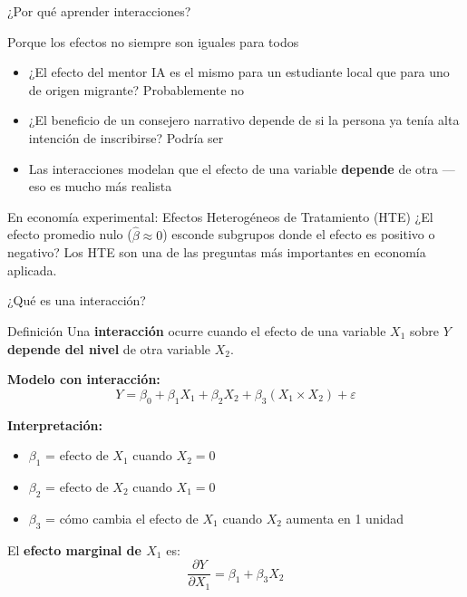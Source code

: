 \documentclass[aspectratio=169, 11pt]{beamer}
\begin{document}
\begin{frame}{¿Por qué aprender interacciones?}
\begin{exampleblock}{Porque los efectos no siempre son iguales para todos}
\small
\begin{itemize}\setlength{\itemsep}{2pt}
  \item ¿El efecto del mentor IA es el mismo para un estudiante local que para uno de origen migrante? Probablemente no
  \item ¿El beneficio de un consejero narrativo depende de si la persona ya tenía alta intención de inscribirse? Podría ser
  \item Las interacciones modelan que el efecto de una variable \textbf{depende} de otra --- eso es mucho más realista
\end{itemize}
\end{exampleblock}

\vspace{0.2cm}
\begin{block}{En economía experimental: Efectos Heterogéneos de Tratamiento (HTE)}
\small
¿El efecto promedio nulo ($\hat{\beta} \approx 0$) esconde subgrupos donde el efecto es positivo o negativo? Los HTE son una de las preguntas más importantes en economía aplicada.
\end{block}
\end{frame}

\begin{frame}{¿Qué es una interacción?}
\begin{block}{Definición}
Una \textbf{interacción} ocurre cuando el efecto de una variable $X_1$ sobre $Y$ \textbf{depende del nivel} de otra variable $X_2$.
\end{block}

\vspace{0.2cm}
\textbf{Modelo con interacción:}
\[
Y = \beta_0 + \beta_1 X_1 + \beta_2 X_2 + \beta_3 (X_1 \times X_2) + \varepsilon
\]

\vspace{0.1cm}
\textbf{Interpretación:}
\begin{itemize}
  \item $\beta_1$ = efecto de $X_1$ cuando $X_2 = 0$
  \item $\beta_2$ = efecto de $X_2$ cuando $X_1 = 0$
  \item $\beta_3$ = cómo cambia el efecto de $X_1$ cuando $X_2$ aumenta en 1 unidad
\end{itemize}

\vspace{0.2cm}
El \textbf{efecto marginal de $X_1$} es:
\[
\frac{\partial Y}{\partial X_1} = \beta_1 + \beta_3 X_2
\]
\end{frame}
\end{document}
